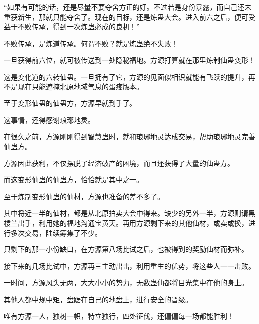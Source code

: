 \begin{this_body}
“如果有可能的话，还是尽量不要夺舍方正的好。不过若是身份暴露，而自己还未重获新生，那就只能夺舍了。现在的目标，还是炼蛊大会。进入前六之后，便可受益于不败传承，得到一次炼蛊必成的良机！”

不败传承，是炼道传承。何谓不败？就是炼蛊绝不失败！

一旦获得前六位，就可被传送到一处隐秘福地。方源打算就在那里炼制仙蛊变形！

这是变化道的六转仙蛊。一旦拥有了它，方源的见面似相识就能有飞跃的提升，再不是现在只能遮掩北原地域气息的蛋疼版本。

至于变形仙蛊的仙蛊方，方源早就到手了。

这事情，还得感谢琅琊地灵。

在很久之前，方源刚刚得到智慧蛊时，就和琅琊地灵达成交易，帮助琅琊地灵完善仙蛊方。

方源因此获利，不仅摆脱了经济破产的困境，而且还获得了大量的仙蛊方。

而这变形仙蛊的仙蛊方，恰恰就是其中之一。

至于炼制变形仙蛊的仙材，方源也准备的差不多了。

其中将近一半的仙材，都是从北原拍卖大会中得来。缺少的另外一半，方源则请黑楼兰出手，利用她的福地沟通宝黄天。再用方源剩下来的其他仙材，或卖或换，进行多次交易，陆续筹集了不少。

只剩下的那一小份缺口，在方源第八场比试之后，也被得到的奖励仙材而弥补。

接下来的几场比试中，方源再三主动出击，利用重生的优势，将这些人一一击败。

一时间，方源风头无两，大大小小的势力，无数蛊仙都将目光集中在他的身上。

其他人都中规中矩，盘踞在自己的地盘上，进行安全的晋级。

唯有方源一人，独树一帜，特立独行，四处征伐，还偏偏每一场都能胜利！

\end{this_body}


